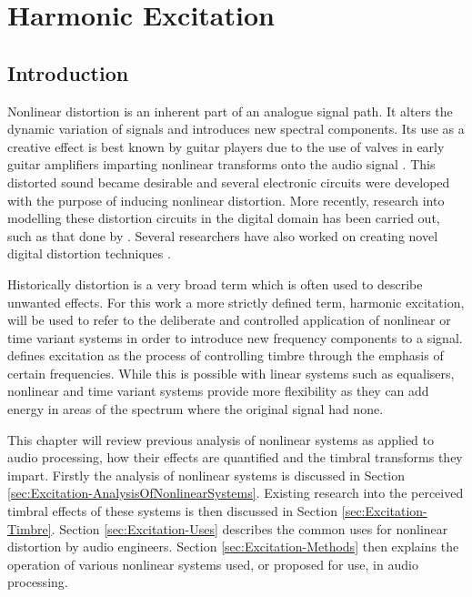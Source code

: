 \chapter{Harmonic Excitation}
\label{chap:Excitation}

\section{Introduction}
\label{sec:Excitation-Introduction}
	Nonlinear distortion is an inherent part of an analogue signal path. It alters the dynamic variation of signals and
	introduces new spectral components. Its use as a creative effect is best known by guitar players due to the use of
	valves in early guitar amplifiers imparting nonlinear transforms onto the audio signal
	\citep{dutilleux2011nonlinear}. This distorted sound became desirable and several electronic circuits were
	developed with the purpose of inducing nonlinear distortion. More recently, research into modelling these
	distortion circuits in the digital domain has been carried out, such as that done by \citet{pakarinen2009a}.
	Several researchers have also worked on creating novel digital distortion techniques
	\citep{fernandez-cid2001distortion, puckette2007patch, pekonen2008coefficient}.

	Historically distortion is a very broad term which is often used to describe unwanted effects. For this work a more
	strictly defined term, harmonic excitation, will be used to refer to the deliberate and controlled application of
	nonlinear or time variant systems in order to introduce new frequency components to a signal.
	\citet{dutilleux2011nonlinear} defines excitation as the process of controlling timbre through the emphasis of
	certain frequencies. While this is possible with linear systems such as equalisers, nonlinear and time variant
	systems provide more flexibility as they can add energy in areas of the spectrum where the original signal had
	none.

	This chapter will review previous analysis of nonlinear systems as applied to audio processing, how their effects
	are quantified and the timbral transforms they impart. Firstly the analysis of nonlinear systems is discussed in
	Section \ref{sec:Excitation-AnalysisOfNonlinearSystems}. Existing research into the perceived timbral effects of
	these systems is then discussed in Section \ref{sec:Excitation-Timbre}. Section \ref{sec:Excitation-Uses} describes
	the common uses for nonlinear distortion by audio engineers. Section \ref{sec:Excitation-Methods} then explains the
	operation of various nonlinear systems used, or proposed for use, in audio processing.

